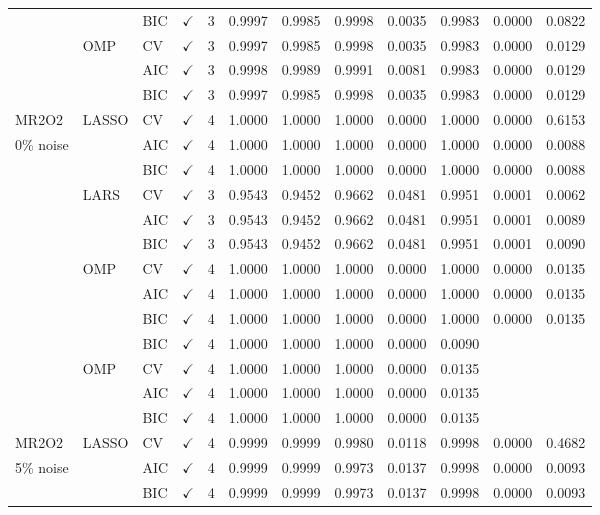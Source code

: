 \documentclass[11pt,a4paper]{article}
\begin{document}
{\begin{longtable}{@{}lllccccccccc@{}}
& & BIC & $\checkmark$ & 3 & 0.9997 & 0.9985 & 0.9998 & 0.0035 & 0.9983 & 0.0000 & 0.0822 \\
& OMP & CV & $\checkmark$ & 3 & 0.9997 & 0.9985 & 0.9998 & 0.0035 & 0.9983 & 0.0000 & 0.0129 \\
& & AIC & $\checkmark$ & 3 & 0.9998 & 0.9989 & 0.9991 & 0.0081 & 0.9983 & 0.0000 & 0.0129 \\
& & BIC & $\checkmark$ & 3 & 0.9997 & 0.9985 & 0.9998 & 0.0035 & 0.9983 & 0.0000 & 0.0129 \\ \midrule
MR2O2 & LASSO & CV & $\checkmark$ & 4 & 1.0000 & 1.0000 & 1.0000 & 0.0000 & 1.0000 & 0.0000 & 0.6153 \\
0\% noise & & AIC & $\checkmark$ & 4 & 1.0000 & 1.0000 & 1.0000 & 0.0000 & 1.0000 & 0.0000 & 0.0088 \\
& & BIC & $\checkmark$ & 4 & 1.0000 & 1.0000 & 1.0000 & 0.0000 & 1.0000 & 0.0000 & 0.0088 \\
& LARS & CV & $\checkmark$ & 3 & 0.9543 & 0.9452 & 0.9662 & 0.0481 & 0.9951 & 0.0001 & 0.0062 \\
& & AIC & $\checkmark$ & 3 & 0.9543 & 0.9452 & 0.9662 & 0.0481 & 0.9951 & 0.0001 & 0.0089 \\
& & BIC & $\checkmark$ & 3 & 0.9543 & 0.9452 & 0.9662 & 0.0481 & 0.9951 & 0.0001 & 0.0090 \\
& OMP & CV & $\checkmark$ & 4 & 1.0000 & 1.0000 & 1.0000 & 0.0000 & 1.0000 & 0.0000 & 0.0135 \\
& & AIC & $\checkmark$ & 4 & 1.0000 & 1.0000 & 1.0000 & 0.0000 & 1.0000 & 0.0000 & 0.0135 \\
& & BIC & $\checkmark$ & 4 & 1.0000 & 1.0000 & 1.0000 & 0.0000 & 1.0000 & 0.0000 & 0.0135 \\ \midrule
& & BIC & $\checkmark$ & 4 & 1.0000 & 1.0000 & 1.0000 & 0.0000 & 0.0090 \\
& OMP & CV & $\checkmark$ & 4 & 1.0000 & 1.0000 & 1.0000 & 0.0000 & 0.0135 \\
& & AIC & $\checkmark$ & 4 & 1.0000 & 1.0000 & 1.0000 & 0.0000 & 0.0135 \\
& & BIC & $\checkmark$ & 4 & 1.0000 & 1.0000 & 1.0000 & 0.0000 & 0.0135 \\ \midrule
MR2O2 & LASSO & CV & $\checkmark$ & 4 & 0.9999 & 0.9999 & 0.9980 & 0.0118 & 0.9998 & 0.0000 & 0.4682 \\
5\% noise & & AIC & $\checkmark$ & 4 & 0.9999 & 0.9999 & 0.9973 & 0.0137 & 0.9998 & 0.0000 & 0.0093 \\
& & BIC & $\checkmark$ & 4 & 0.9999 & 0.9999 & 0.9973 & 0.0137 & 0.9998 & 0.0000 & 0.0093 \\

\end{longtable}}
\end{document}
